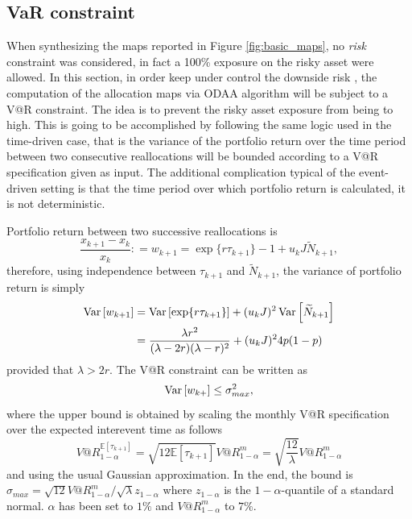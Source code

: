 \subsection{VaR constraint}\label{subsec:Var_basic}
When synthesizing the maps reported in Figure \ref{fig:basic_maps}, no \textit{risk} constraint was considered, in fact a 100\% exposure on the risky asset were allowed. In this section, in order keep under control the downside risk , the computation of the allocation maps via \gls{ODAA} algorithm will be subject to a V@R constraint. The idea is to prevent the risky asset exposure from being to high. This is going to be accomplished by following the same logic used in the time-driven case, that is the variance of the portfolio return over the time period between two consecutive reallocations will be bounded according to a V@R specification given as input. The additional complication typical of the event-driven setting is that the time period over which portfolio return is calculated, it is not deterministic.

Portfolio return between two successive reallocations is
\begin{equation}
\frac{x_{k+1}-x_k}{x_k} \colon= w_{k+1} = \exp\{r \tau_{k+1}\}  - 1 + u_k J \widetilde{N}_{k+1},
\end{equation}
therefore, using independence between $\tau_{k+1}$ and $\widetilde{N}_{k+1}$, the variance of portfolio return is simply
\begin{align}
\nonumber
\operatorname{Var}\left[w_{k+1}\right] &= \operatorname{Var}\left[\exp\{r \tau_{k+1}\}\right] + (u_k J)^2\operatorname{Var}\left[\widetilde{N}_{k+1}\right]\\
& = \frac{\lambda r^2}{(\lambda-2r)(\lambda-r)^2}+(u_k J)^24p(1-p)
\end{align}
provided that $\lambda > 2r$. The V@R constraint can be written as
\begin{equation}\label{eq:bounded_volatility}
\operatorname{Var}\left[w_{k+}\right] \leq \sigma_{max}^2,
\end{equation}
where the upper bound is obtained by scaling the monthly V@R specification over the expected interevent time as follows
\begin{equation}\label{eq:var_scaling}
V@R^{\mathbb{E}[\tau_{k+1}]}_{1-\alpha}=\sqrt{12\mathbb{E}[\tau_{k+1}]}V@R^{m}_{1-\alpha}= \sqrt{\frac{12}{\lambda}}V@R^{m}_{1-\alpha}
\end{equation}
and using the usual Gaussian approximation. In the end, the bound is $\sigma_{max}=\sqrt{12}V@R^{m}_{1-\alpha}/\sqrt{\lambda}z_{1-\alpha}$ where $z_{1-\alpha}$ is the $1-\alpha$-quantile of a standard normal.
$\alpha$ has been set to $1\%$ and $V@R^{m}_{1-\alpha}$ to $7\%$.


